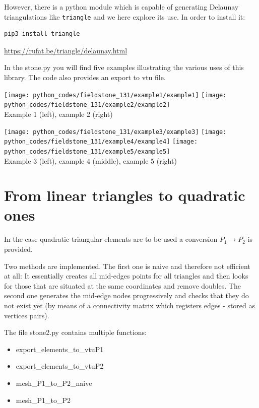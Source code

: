 However, there is a python module which is capable of generating Delaunay triangulations like {\tt triangle}
and we here explore its use. In order to install it:
\begin{verbatim}
pip3 install triangle
\end{verbatim}

\url{https://rufat.be/triangle/delaunay.html}

In the {\python stone.py} you will find five examples illustrating the various 
uses of this library. The code also provides an export to vtu file. 


\begin{center}
\texttt{[image: python\_codes/fieldstone\_131/example1/example1]}
\texttt{[image: python\_codes/fieldstone\_131/example2/example2]}\\
{\captionfont Example 1 (left), example 2 (right)}
\end{center}


\begin{center}
\texttt{[image: python\_codes/fieldstone\_131/example3/example3]}
\texttt{[image: python\_codes/fieldstone\_131/example4/example4]}
\texttt{[image: python\_codes/fieldstone\_131/example5/example5]}\\
{\captionfont Example 3 (left), example 4 (middle), example 5 (right)}
\end{center}

\section*{From linear triangles to quadratic ones}

In the case quadratic triangular elements are to be used a conversion $P_1 \rightarrow P_2$
is provided.

Two methods are implemented. The first one is naive and therefore not efficient at all:
It essentially creates all mid-edges points for all triangles and then looks for those 
that are situated at the same coordinates and remove doubles. 
The second one generates the mid-edge nodes progressively and checks that they do not 
exist yet (by means of a connectivity matrix which registers edges - 
stored as vertices pairs).


The file {\pythonfile stone2.py} contains multiple functions:
\begin{itemize}
\item {\python export\_elements\_to\_vtuP1}
\item {\python export\_elements\_to\_vtuP2}
\item {\python mesh\_P1\_to\_P2\_naive}
\item {\python mesh\_P1\_to\_P2}
\end{itemize}

